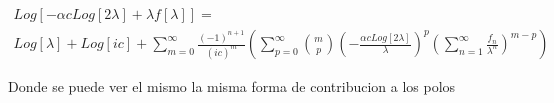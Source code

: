 \begin{equation}
\begin{array}{c}
Log[- \alpha c Log[2 \lambda] + \lambda f[\lambda] ] = \\
Log[\lambda] + Log[i c] + 
\sum _{m=0} ^{\infty} \frac{(-1)^{n+1}}{(i c) ^m}
							\left(
								\sum _{p=0} ^{\infty} {m\choose p} 
									\left( - \frac{ \alpha c Log[2 \lambda] } {\lambda} \right) ^p
									\left( \sum _{n=1} ^{\infty} \frac{f _n}{\lambda ^n} \right) ^{m-p} 
								\right)
\end{array}
\end{equation}

Donde se puede ver el mismo la misma forma de contribucion a los polos 




